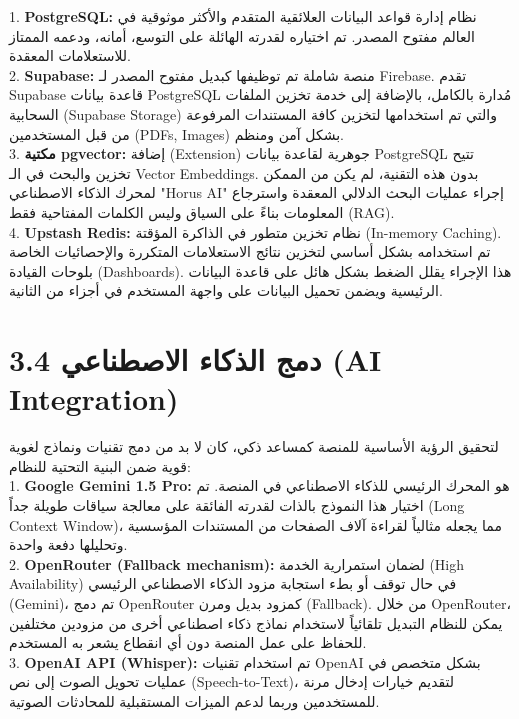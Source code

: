 \documentclass[12pt, a4paper]{report}
\begin{document}
\begin{english}
1. \textbf{PostgreSQL:} نظام إدارة قواعد البيانات العلائقية المتقدم والأكثر موثوقية في العالم مفتوح المصدر. تم اختياره لقدرته الهائلة على التوسع، أمانه، ودعمه الممتاز للاستعلامات المعقدة. \\
2. \textbf{Supabase:} منصة شاملة تم توظيفها كبديل مفتوح المصدر لـ Firebase. تقدم Supabase قاعدة بيانات PostgreSQL مُدارة بالكامل، بالإضافة إلى خدمة تخزين الملفات السحابية (Supabase Storage) والتي تم استخدامها لتخزين كافة المستندات المرفوعة من قبل المستخدمين (PDFs, Images) بشكل آمن ومنظم. \\
3. \textbf{مكتية pgvector:} إضافة (Extension) جوهرية لقاعدة بيانات PostgreSQL تتيح تخزين والبحث في الـ Vector Embeddings. بدون هذه التقنية، لم يكن من الممكن لمحرك الذكاء الاصطناعي "Horus AI" إجراء عمليات البحث الدلالي المعقدة واسترجاع المعلومات بناءً على السياق وليس الكلمات المفتاحية فقط (RAG). \\
4. \textbf{Upstash Redis:} نظام تخزين متطور في الذاكرة المؤقتة (In-memory Caching). تم استخدامه بشكل أساسي لتخزين نتائج الاستعلامات المتكررة والإحصائيات الخاصة بلوحات القيادة (Dashboards). هذا الإجراء يقلل الضغط بشكل هائل على قاعدة البيانات الرئيسية ويضمن تحميل البيانات على واجهة المستخدم في أجزاء من الثانية. \\

\section*{3.4 دمج الذكاء الاصطناعي (AI Integration)}

لتحقيق الرؤية الأساسية للمنصة كمساعد ذكي، كان لا بد من دمج تقنيات ونماذج لغوية قوية ضمن البنية التحتية للنظام: \\

1. \textbf{Google Gemini 1.5 Pro:} هو المحرك الرئيسي للذكاء الاصطناعي في المنصة. تم اختيار هذا النموذج بالذات لقدرته الفائقة على معالجة سياقات طويلة جداً (Long Context Window)، مما يجعله مثالياً لقراءة آلاف الصفحات من المستندات المؤسسية وتحليلها دفعة واحدة. \\
2. \textbf{OpenRouter (Fallback mechanism):} لضمان استمرارية الخدمة (High Availability) في حال توقف أو بطء استجابة مزود الذكاء الاصطناعي الرئيسي (Gemini)، تم دمج OpenRouter كمزود بديل ومرن (Fallback). من خلال OpenRouter، يمكن للنظام التبديل تلقائياً لاستخدام نماذج ذكاء اصطناعي أخرى من مزودين مختلفين للحفاظ على عمل المنصة دون أي انقطاع يشعر به المستخدم. \\
3. \textbf{OpenAI API (Whisper):} تم استخدام تقنيات OpenAI بشكل متخصص في عمليات تحويل الصوت إلى نص (Speech-to-Text)، لتقديم خيارات إدخال مرنة للمستخدمين وربما لدعم الميزات المستقبلية للمحادثات الصوتية. \\


\end{english}
\end{document}
